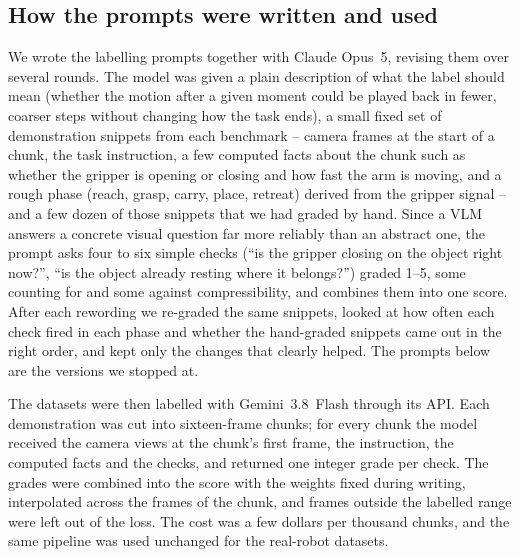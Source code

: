 \subsection{How the prompts were written and used}
\label{app:prompt}

We wrote the labelling prompts together with Claude Opus~5, revising them over
several rounds. The model was given a plain description of what the label should
mean (whether the motion after a given moment could be played back in fewer, coarser
steps without changing how the task ends), a small fixed set of demonstration
snippets from each benchmark -- camera frames at the start of a chunk, the task
instruction, a few computed facts about the chunk such as whether the gripper is
opening or closing and how fast the arm is moving, and a rough phase (reach, grasp,
carry, place, retreat) derived from the gripper signal -- and a few dozen of those
snippets that we had graded by hand. Since a VLM answers a concrete visual question
far more reliably than an abstract one, the prompt asks four to six simple checks
(``is the gripper closing on the object right now?'', ``is the object already
resting where it belongs?'') graded 1--5, some counting for and some against
compressibility, and combines them into one score. After each rewording we
re-graded the same snippets, looked at how often each check fired in each phase and
whether the hand-graded snippets came out in the right order, and kept only the
changes that clearly helped. The prompts below are the versions we stopped at.

The datasets were then labelled with Gemini~3.8~Flash through its API. Each
demonstration was cut into sixteen-frame chunks; for every chunk the model received
the camera views at the chunk's first frame, the instruction, the computed facts and
the checks, and returned one integer grade per check. The grades were combined into
the score with the weights fixed during writing, interpolated across the frames of
the chunk, and frames outside the labelled range were left out of the loss. The cost
was a few dollars per thousand chunks, and the same pipeline was used unchanged for
the real-robot datasets.
